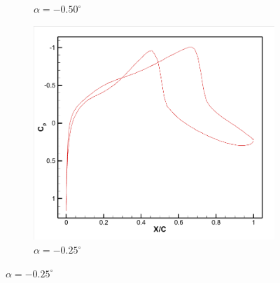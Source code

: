 \begin{figure}[H]
\begin{subfigure}[b]{0.18\textwidth}
\caption{$\alpha=-0.50^\circ$}
\end{subfigure}
\hfill
\begin{subfigure}[b]{0.18\textwidth}
\centering
\includegraphics[width=\linewidth]{5.png}
\caption{$\alpha=-0.25^\circ$}
\end{subfigure}

\vspace{0.5cm} %


\end{figure}
